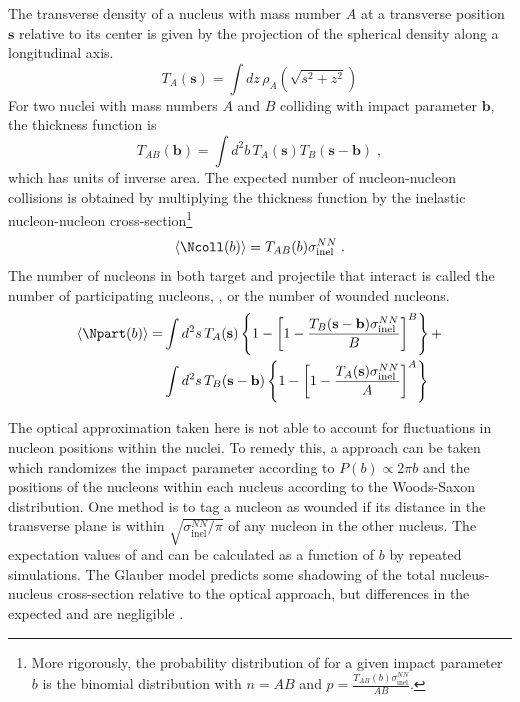 The transverse density of a nucleus with mass number $A$ at a transverse position $\mathbf{s}$ relative to its center is given by the projection of the spherical density along a longitudinal axis.
\begin{equation}
T_A(\mathbf{s}) = \int dz \, \rho_A\left( \sqrt{s^2 + z^2} \right)
\end{equation}
For two nuclei with mass numbers $A$ and $B$ colliding with impact parameter $\mathbf{b}$, the thickness function is
\begin{equation}
T_{AB}(\mathbf{b}) = \int d^2 b \, T_A(\mathbf{s}) T_B(\mathbf{s} - \mathbf{b}) \;,
\end{equation}
which has units of inverse area.
The expected number of nucleon-nucleon collisions \Ncoll is obtained by multiplying the thickness function by the inelastic nucleon-nucleon cross-section\footnote{More rigorously, the probability distribution of \Ncoll for a given impact parameter $b$ is the binomial distribution with $n = AB$ and $p = \frac{T_{AB}(b) \sigma^{NN}_\mathrm{inel}}{AB}$. }
\begin{equation}
  \langle\Ncoll(b)\rangle = T_{AB}(b) \sigma^{NN}_\mathrm{inel} \;.
\end{equation}
The number of nucleons in both target and projectile that interact is called the number of participating nucleons, \Npart, or the number of wounded nucleons.
\begin{equation}
  \begin{split}
  \langle \Npart(b) \rangle = &\int d^2 s \, T_A(\mathbf{s})\left\{ 1 - \left[ 1 - \frac{T_B (\mathbf{s} - \mathbf{b}) \sigma^{NN}_\mathrm{inel}}{B} \right]^B \right\} + \\
  &\int d^2 s \, T_B(\mathbf{s}-\mathbf{b})\left\{ 1 - \left[ 1 - \frac{T_A (\mathbf{s}) \sigma^{NN}_\mathrm{inel}}{A} \right]^A \right\}
  \end{split}
\end{equation}

The optical approximation taken here is not able to account for fluctuations in nucleon positions within the nuclei.
To remedy this, a \mc approach can be taken which randomizes the impact parameter according to $P(b) \propto 2\pi b$ and the positions of the nucleons within each nucleus according to the Woods-Saxon distribution.
One method is to tag a nucleon as wounded if its distance in the transverse plane is within $\sqrt{\sigma^{NN}_\mathrm{inel}/\pi}$ of any nucleon in the other nucleus.
The expectation values of \Ncoll and \Npart can be calculated as a function of $b$ by repeated simulations. 
The Glauber \mc model predicts some shadowing of the total nucleus-nucleus cross-section relative to the optical approach, but differences in the expected \Ncoll and \Npart are negligible \cite{Miller:2007ri}. %

